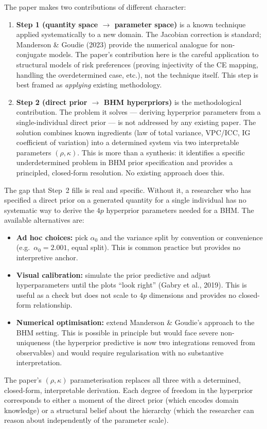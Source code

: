 \documentclass[12pt,a4paper]{article}
\begin{document}
The paper makes two contributions of different character:

\begin{enumerate}[label=(\roman*)]
  \item \textbf{Step 1 (quantity space $\to$ parameter space)} is a known
    technique applied systematically to a new domain. The Jacobian correction is
    standard; Manderson \& Goudie (2023) provide the numerical analogue for
    non-conjugate models. The paper's contribution here is the careful
    application to structural models of risk preferences (proving injectivity
    of the CE mapping, handling the overdetermined case, etc.), not the
    technique itself. This step is best framed as \emph{applying} existing
    methodology.

  \item \textbf{Step 2 (direct prior $\to$ BHM hyperpriors)} is the
    methodological contribution. The problem it solves --- deriving hyperprior
    parameters from a single-individual direct prior --- is not addressed by
    any existing paper. The solution combines known ingredients (law of total
    variance, VPC/ICC, IG coefficient of variation) into a determined system
    via two interpretable parameters $(\rho, \kappa)$. This is more than a
    synthesis: it identifies a specific underdetermined problem in BHM prior
    specification and provides a principled, closed-form resolution. No
    existing approach does this.
\end{enumerate}

\noindent The gap that Step~2 fills is real and specific. Without it, a
researcher who has specified a direct prior on a generated quantity for a single
individual has no systematic way to derive the $4p$ hyperprior parameters needed
for a BHM. The available alternatives are:
\begin{itemize}
  \item \textbf{Ad hoc choices:} pick $\alpha_0$ and the variance split by
    convention or convenience (e.g.\ $\alpha_0 = 2.001$, equal split). This is
    common practice but provides no interpretive anchor.
  \item \textbf{Visual calibration:} simulate the prior predictive and adjust
    hyperparameters until the plots ``look right'' (Gabry et al., 2019). This
    is useful as a check but does not scale to $4p$ dimensions and provides no
    closed-form relationship.
  \item \textbf{Numerical optimisation:} extend Manderson \& Goudie's approach
    to the BHM setting. This is possible in principle but would face severe
    non-uniqueness (the hyperprior predictive is now two integrations removed
    from observables) and would require regularisation with no substantive
    interpretation.
\end{itemize}
The paper's $(\rho, \kappa)$ parameterisation replaces all three with a
determined, closed-form, interpretable derivation. Each degree of freedom in
the hyperprior corresponds to either a moment of the direct prior (which
encodes domain knowledge) or a structural belief about the hierarchy (which the
researcher can reason about independently of the parameter scale).
\end{document}
